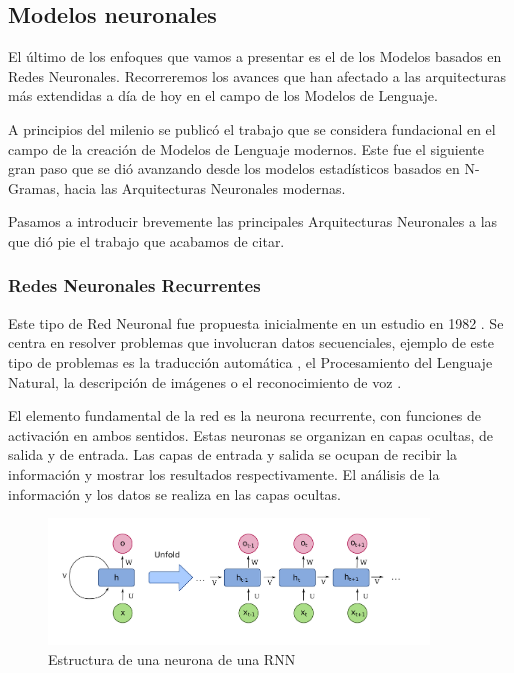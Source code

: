 \subsection{Modelos neuronales}

El último de los enfoques que vamos a presentar es el de los Modelos basados en Redes Neuronales. Recorreremos los avances que han afectado a las arquitecturas más extendidas a día de hoy en el campo de los Modelos de Lenguaje.

A principios del milenio se publicó el trabajo \cite{bengio2000neural} que se considera fundacional en el campo de la creación de Modelos de Lenguaje modernos. Este fue el siguiente gran paso que se dió avanzando desde los modelos estadísticos basados en N-Gramas, hacia las Arquitecturas Neuronales modernas.

Pasamos a introducir brevemente las principales Arquitecturas Neuronales a las que dió pie el trabajo que acabamos de citar.

\subsubsection{Redes Neuronales Recurrentes}

Este tipo de Red Neuronal fue propuesta inicialmente en un estudio en 1982 \citep{hopfield1982neural}. Se centra en resolver problemas que involucran datos secuenciales, ejemplo de este tipo de problemas es la traducción automática \citep{sutskever2014sequence}, el Procesamiento del Lenguaje Natural, la descripción de imágenes \citep{karpathy2015deep} o el reconocimiento de voz \citep{hannun2014deep}.

El elemento fundamental de la red es la neurona recurrente, con funciones de activación en ambos sentidos. Estas neuronas se organizan en capas ocultas, de salida y de entrada. Las capas de entrada y salida se ocupan de recibir la información y mostrar los resultados respectivamente. El análisis de la información y los datos se realiza en las capas ocultas.

\begin{figure}[h]
	\centering
	\includegraphics[width = 0.9\textwidth]{Imagenes/Vectorial/RNN_cell.pdf}
	\caption{Estructura de una neurona de una RNN}%
	\label{fig:RNN}
\end{figure}

